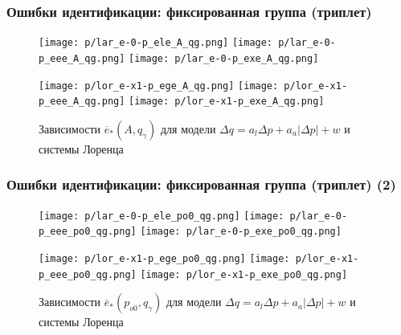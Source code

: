 \documentclass[10pt,utf8]{beamer}
\begin{document}
\begin{frame}
  \frametitle{Ошибки идентификации: фиксированная группа (триплет)}

  \begin{figure}[htb!]
    \begin{center}
      \texttt{[image: p/lar\_e-0-p\_ele\_A\_qg.png]}
      \hfill
      \texttt{[image: p/lar\_e-0-p\_eee\_A\_qg.png]}
      \hfill
      \texttt{[image: p/lar\_e-0-p\_exe\_A\_qg.png]}
    \end{center}
    \begin{center}
      \texttt{[image: p/lor\_e-x1-p\_ege\_A\_qg.png]}
      \hfill
      \texttt{[image: p/lor\_e-x1-p\_eee\_A\_qg.png]}
      \hfill
      \texttt{[image: p/lor\_e-x1-p\_exe\_A\_qg.png]}
    \end{center}
    \caption{Зависимости $\overline{e}_{*}(A,q_\gamma) $ для модели $ \Delta q = a_l \Delta p + a_a |\Delta p| + w $ и системы Лоренца}
    \label{atu:f:iderr_Aqg}
  \end{figure}

\end{frame}




\begin{frame}
  \frametitle{Ошибки идентификации: фиксированная группа (триплет) (2)}

  \begin{figure}[htb!]
    \begin{center}
      \texttt{[image: p/lar\_e-0-p\_ele\_po0\_qg.png]}
      \hfill
      \texttt{[image: p/lar\_e-0-p\_eee\_po0\_qg.png]}
      \hfill
      \texttt{[image: p/lar\_e-0-p\_exe\_po0\_qg.png]}
    \end{center}
    \begin{center}
      \texttt{[image: p/lor\_e-x1-p\_ege\_po0\_qg.png]}
      \hfill
      \texttt{[image: p/lor\_e-x1-p\_eee\_po0\_qg.png]}
      \hfill
      \texttt{[image: p/lor\_e-x1-p\_exe\_po0\_qg.png]}
    \end{center}
    \caption{Зависимости $\overline{e}_{*}(p_{o0},q_\gamma) $ для модели $ \Delta q = a_l \Delta p + a_a |\Delta p| + w $ и системы Лоренца}
    \label{atu:f:iderr_po0qg}
  \end{figure}

\end{frame}
\end{document}

